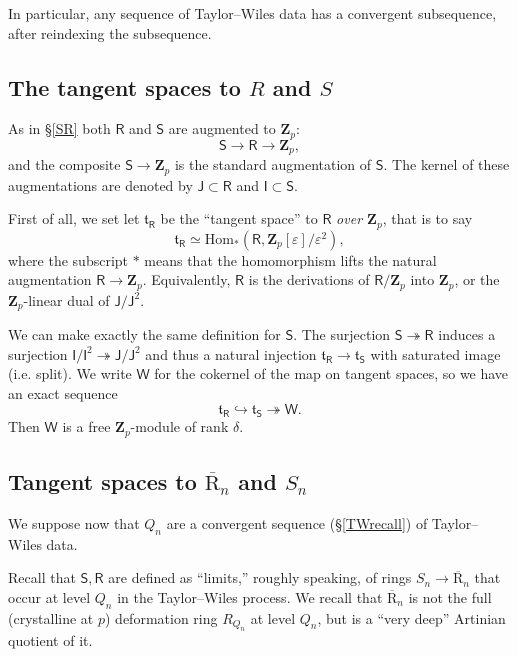 \documentclass[10pt]{amsart}
\newcommand{\Z}{\mathbf{Z}}
\newcommand{\Jinf}{\mathsf{J}}
\newcommand{\usbR}{\overline{\mathrm{R}}}
\newcommand{\Winf}{\mathsf{W}}
\newcommand{\Hom}{\mathrm{Hom}}
\newcommand{\Sinf}{\mathsf{S}}
\newcommand{\Iinf}{\mathsf{I}}
\newcommand{\Rinf}{\mathsf{R}}
\theoremstyle{remark}
\begin{document}
 In particular, any sequence of Taylor--Wiles data has a convergent subsequence, after reindexing the subsequence.

 

\subsection{The tangent spaces to $R$ and $S$} \label{tangentRS}
As in \S \ref{SR} both $\Rinf$ and $\Sinf$ are augmented to $\Z_p$:
$$ \Sinf \rightarrow \Rinf \rightarrow \Z_p,$$
and the composite $\Sinf \rightarrow \Z_p$ is the standard augmentation of $\Sinf$. 
 The kernel of these augmentations are denoted by $\Jinf \subset \Rinf$ and $\Iinf \subset \Sinf$. 
 
 
  First of all, we set let $\mathfrak{t}_{\Rinf}$ be the ``tangent space'' to $\Rinf$  {\em over $\Z_p$}, that is to say \index{$\mathfrak{t}_{\Rinf}$}
$$\mathfrak{t}_{\Rinf} \simeq \Hom_{*}(\Rinf, \Z_p[\varepsilon]/\varepsilon^2),$$ 
where the subscript $*$ means that the homomorphism lifts the natural augmentation $\Rinf \rightarrow \Z_p$.   Equivalently, $\Rinf$ is the derivations of $\Rinf/\Z_p$ into $\Z_p$, 
or the $\Z_p$-linear dual of $\Jinf/\Jinf^2$. 

We can make exactly the same definition for $\Sinf$.  The surjection $\Sinf \twoheadrightarrow \Rinf$ induces 
a surjection $\Iinf/\Iinf^2 \twoheadrightarrow \Jinf/\Jinf^2$ and thus 
 a natural injection $\mathfrak{t}_{\Rinf} \rightarrow \mathfrak{t}_{\Sinf}$ with saturated image (i.e. split). 
We write  $\Winf$ for the cokernel of the map on tangent spaces, so we have an exact sequence 
\begin{equation} \label{Vdef2}  \mathfrak{t}_{\Rinf} \hookrightarrow \mathfrak{t}_{\Sinf}  \twoheadrightarrow \Winf.  \end{equation} 
 Then $\Winf$ is a free $\Z_p$-module of rank $\delta$.
 
 

 \subsection{Tangent spaces to $\usbR_n$ and $S_n$}  \label{tnRnSn}
 
 We suppose now that $Q_n$ are a convergent sequence (\S \ref{TWrecall}) of Taylor--Wiles data.  
  
Recall that $\Sinf, \Rinf$ are defined as ``limits,'' roughly speaking,
of rings $S_n \rightarrow \usbR_n$ that occur at level $Q_n$ in the Taylor--Wiles process.
We recall that $\usbR_n$ is not the full (crystalline at $p$) deformation ring  $R_{Q_n}$ at level $Q_n$, but is a ``very deep'' Artinian quotient of 
it. 
\end{document}
